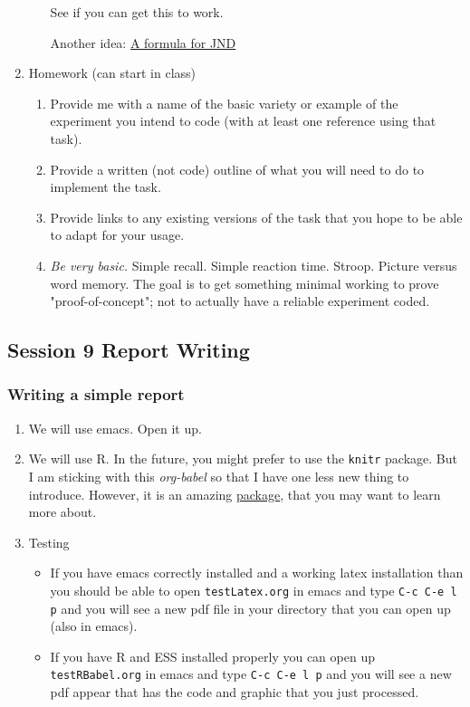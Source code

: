 \documentclass{article}
\begin{document}
\begin{enumerate}
\begin{enumerate}
See if you can get this to work. 

Another idea: \href{https://www.psychopy.org/coder/tutorial2.html}{A formula for JND}
\end{enumerate}

\item Homework (can start in class)
\label{sec:org55d365c}
\begin{enumerate}
\item Provide me with a name of the basic variety or example of the experiment you intend to code (with at least one reference using that task).
\item Provide a written (not code) outline of what you will need to do to implement the task.
\item Provide links to any existing versions of the task that you hope to be able to adapt for your usage.
\item \emph{Be very basic.} Simple recall. Simple reaction time. Stroop. Picture versus word memory. The goal is to get something minimal working to prove "proof-of-concept"; not to actually have a reliable experiment coded.
\end{enumerate}
\end{enumerate}
\subsection{Session 9 Report Writing}
\label{sec:orgfb86d61}
\subsubsection{Writing a simple report}
\label{sec:org6f0e3f2}
\begin{enumerate}
\item We will use emacs. Open it up.
\item We will use R.
In the future, you might prefer to use the \texttt{knitr} package. But I am sticking with this \emph{org-babel} so that I have one less new thing to introduce. However, it is an amazing \href{https://yihui.name/knitr/}{package}, that you may want to learn more about.
\item Testing
\begin{itemize}
\item If you have emacs correctly installed and a working latex installation than you should be able to open \texttt{testLatex.org} in emacs and type \texttt{C-c C-e l p} and you will see a new pdf file in your directory that you can open up (also in emacs).
\item If you have R and ESS installed properly you can open up \texttt{testRBabel.org} in emacs and type \texttt{C-c C-e l p} and you will see a new pdf appear that has the code and graphic that you just processed.
\end{itemize}
\end{enumerate}
\end{document}
